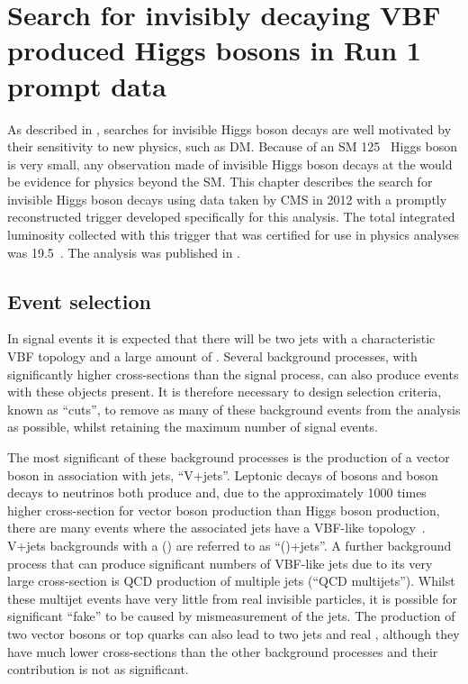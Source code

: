 \chapter{Search for invisibly decaying VBF produced Higgs bosons in Run 1 prompt data}
\label{chap:prompt}
As described in , searches for invisible Higgs boson decays are well motivated by their sensitivity to new physics, such as \ac{DM}. Because \BRinv of an \ac{SM} 125 \GeV\, Higgs boson is very small, any observation made of invisible Higgs boson decays at the \LHC would be evidence for physics beyond the \ac{SM}. This chapter describes the search for invisible Higgs boson decays using data taken by CMS in 2012 with a promptly reconstructed trigger developed specifically for this analysis. The total integrated luminosity collected with this trigger that was certified for use in physics analyses was 19.5\invfb~. The analysis was published in .

\section{Event selection}
\label{sec:promptsel}
In signal events it is expected that there will be two jets with a characteristic \ac{VBF} topology and a large amount of \MET. Several background processes, with significantly higher cross-sections than the signal process, can also produce events with these objects present. It is therefore necessary to design selection criteria, known as ``cuts'', to remove as many of these background events from the analysis as possible, whilst retaining the maximum number of signal events.

The most significant of these background processes is the production of a vector boson in association with jets, ``V+jets''. Leptonic decays of \PW bosons and \PZ boson decays to neutrinos both produce \MET and, due to the approximately 1000 times higher cross-section for vector boson production than Higgs boson production, there are many events where the associated jets have a \ac{VBF}-like topology~\cite{CMSSMPPublic}. V+jets backgrounds with a \PW (\PZ) are referred to as ``\PW(\PZ)+jets''.
A further background process that can produce significant numbers of \ac{VBF}-like jets due to its very large cross-section is \ac{QCD} production of multiple jets (``\ac{QCD} multijets''). Whilst these multijet events have very little \MET from real invisible particles, it is possible for significant ``fake'' \MET to be caused by mismeasurement of the jets. The production of two vector bosons or top quarks can also lead to two jets and real \MET, although they have much lower cross-sections than the other background processes and their contribution is not as significant. %

